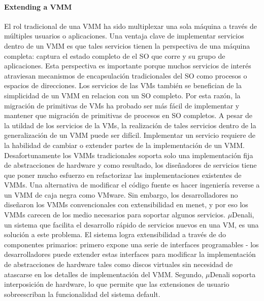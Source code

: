 \paragraph{\textnormal{\textbf{Extending a VMM}}}
El rol tradicional de una VMM ha sido multiplexar una sola máquina a través de múltiples usuarios o aplicaciones. Una ventaja clave de implementar servicios dentro de un VMM es que tales servicios tienen la perspectiva de una máquina completa: captura el estado completo de el SO que corre y su grupo de aplicaciones. Esta perspectiva es importante porque muchos servicios de interés atraviesan mecanismos de encapsulación tradicionales del SO como procesos o espacios de direcciones. Los servicios de las VMs también se benefician de la simplicidad de un VMM en relacion con un SO completo. Por esta razón, la migración de primitivas de VMs ha probado ser más fácil de implementar y mantener que migración de primitivas de procesos en SO completos. A pesar de la utildad de los servicios de la VMs, la realización de tales servicios dentro de la generalización de un VMM puede ser difícil. Implementar un servicio requiere de la habilidad de cambiar o extender partes de la implementación de un VMM. Desafortunamente los VMMs tradicionales soporta solo una implementación fija de abstracciones de hardware y como resultado, los diseñadores de servicios tiene que poner mucho esfuerzo en refactorizar las implementaciones existentes de VMMs. Una alternativa de modificar el código fuente es hacer ingeniería reverse a un VMM de caja negra como VMware. Sin embargo, los desarrolladores no diseñaron los VMMs convencionales con extensibilidad en menet, y por eso los VMMs carecen de los medio necesarios para soportar algunos servicios. $\mu$Denali, un sistema que facilita el desarrollo rápido de servicios nuevos en una VM, es una solución a este problema. El sistema logra extensibilidad a través de do componentes primarios: primero expone una serie de interfaces programables - los desarrolladores puede extender estas interfaces para modificar la implementación de abstracciones de hardware tales como discos virtuales sin necesidad de atascarse en los detalles de implementación del VMM. Segundo, $\mu$Denali soporta interposición de hardware, lo que permite que las extensiones de usuario sobreescriban la funcionalidad del sistema default. 


